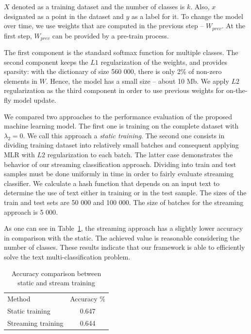 $X$ denoted as a training dataset and the number of classes is $k$. Also, $x$ designated as a point in the dataset and $y$ as a label for it. To change the model over time, we use weights that are computed in the previous step -- $W_{prev}$. At the first step, $W_{prev}$ can be provided by a pre-train process.

The first component is the standard softmax function for multiple classes. The second component keeps the $L1$ regularization of the weights, and provides sparsity: with the dictionary of size 560 000, there is only 2\% of non-zero elements in $W$. Hence, the model has a small size -- about 10 Mb. We apply $L2$ regularization as the third component in order to use previous weights for on-the-fly model update.

We compared two approaches to the performance evaluation of the proposed machine learning model. The first one is training on the complete dataset with $\lambda_2 = 0$. We call this approach a {\em static training}. The second one consists in dividing training dataset into relatively small batches and consequent applying MLR with $L2$ regularization to each batch. The latter case demonstrates the behavior of our streaming classification approach. Dividing into train and test samples must be done uniformly in time in order to fairly evaluate streaming classifier. We calculate a hash function that depends on an input text to determine the use of text either in training or in the test sample. The sizes of the train and test sets are 50 000 and 100 000. The size of batches for the streaming approach is 5 000.

As one can see in Table~\ref{accuracy}, the streaming approach has a slightly lower accuracy in comparison with the static. The achieved value is reasonable considering the number of classes. These results indicate that our framework is able to efficiently solve the text multi-classification problem.

\begin{table}[htbp]
\caption{Accuracy comparison between static and stream training}
\begin{tabular}{lc}
Method             & Accuracy \% \\
Static training    & 0.647       \\
Streaming training & 0.644         
\end{tabular}
\label{accuracy}
\vspace{-7mm}
\end{table}